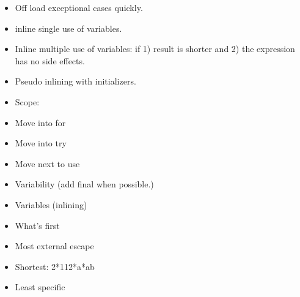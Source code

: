 \begin{itemize}
  \item Off load exceptional cases quickly.
  \item inline single use of variables.
  \item Inline multiple use of variables: if 1) result is shorter and 2) the expression has no side effects.
  \item Pseudo inlining with initializers.
  \item Scope:
\end{itemize}
\begin{itemize}
 \item Move into for
 \item Move into try
 \item Move next to use
\end{itemize}
\begin{itemize}
\item Variability (add final when possible.)
\item Variables (inlining)
\item What’s first
\end{itemize}
\begin{itemize}
 \item Most external escape
 \item Shortest: 2*112*a*ab
 \item Least specific
\end{itemize}

